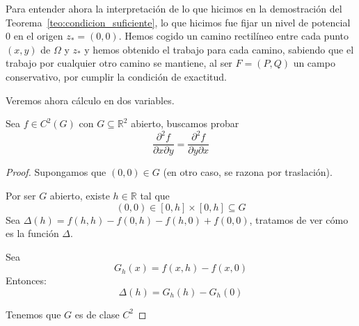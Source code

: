 Para entender ahora la interpretación de lo que hicimos en la demostración del Teorema~\ref{teo:condicion_suficiente}, lo que hicimos fue fijar un nivel de potencial 0 en el origen $z_\ast = (0,0)$. Hemos cogido un camino rectilíneo entre cada punto $(x,y)$ de $\Omega$ y $z_\ast$ y hemos obtenido el trabajo para cada camino, sabiendo que el trabajo por cualquier otro camino se mantiene, al ser $F=(P, Q)$ un campo conservativo, por cumplir la condición de exactitud.


Veremos ahora cálculo en dos variables.

\begin{teo}[de Clairaut]
Sea $f\in C^2(G)$ con $G\subseteq \mathbb{R}^2$ abierto, buscamos probar
\begin{equation*}
    \dfrac{\partial^2 f}{\partial x\partial y} = \dfrac{\partial^2 f}{\partial y\partial x}
\end{equation*}
\begin{proof}
    Supongamos que $(0,0)\in G$ (en otro caso, se razona por traslación).

    Por ser $G$ abierto, existe $h\in \mathbb{R}$ tal que
    \begin{equation*}
        (0,0) \in [0,h]\times [0,h] \subseteq G
    \end{equation*}
    Sea $\Delta(h) = f(h,h)-f(0,h)-f(h,0)+f(0,0)$, tratamos de ver cómo es la función $\Delta$.

    Sea 
    \begin{equation*}
        G_h(x) = f(x,h) - f(x,0)
    \end{equation*}
    Entonces:
    \begin{equation*}
        \Delta(h) = G_h(h) - G_h(0)
    \end{equation*}

    Tenemos que $G$ es de clase $C^2$ 


\end{proof}
\end{teo}
